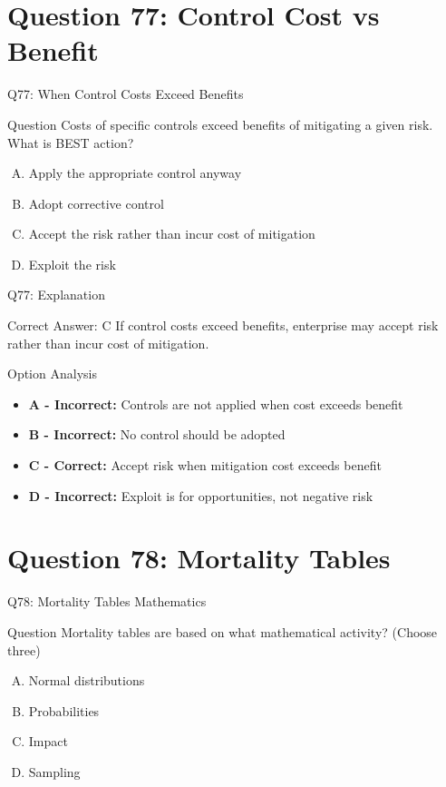 \documentclass{beamer}
\begin{document}
	
	
	
	
	
	\section{Question 77: Control Cost vs Benefit}
	
	\begin{frame}{Q77: When Control Costs Exceed Benefits}
		\begin{block}{Question}
			Costs of specific controls exceed benefits of mitigating a given risk. What is BEST action?
		\end{block}
		\begin{enumerate}[(A)]
			\item Apply the appropriate control anyway
			\item Adopt corrective control
			\item Accept the risk rather than incur cost of mitigation
			\item Exploit the risk
		\end{enumerate}
	\end{frame}
	
	\begin{frame}{Q77: Explanation}
		\begin{block}{Correct Answer: C}
			If control costs exceed benefits, enterprise may accept risk rather than incur cost of mitigation.
		\end{block}
		\begin{block}{Option Analysis}
			\begin{itemize}
				\item \textbf{A - Incorrect:} Controls are not applied when cost exceeds benefit
				\item \textbf{B - Incorrect:} No control should be adopted
				\item \textbf{C - Correct:} Accept risk when mitigation cost exceeds benefit
				\item \textbf{D - Incorrect:} Exploit is for opportunities, not negative risk
			\end{itemize}
		\end{block}
	\end{frame}
	
	\section{Question 78: Mortality Tables}
	
	\begin{frame}{Q78: Mortality Tables Mathematics}
		\begin{block}{Question}
			Mortality tables are based on what mathematical activity? (Choose three)
		\end{block}
		\begin{enumerate}[(A)]
			\item Normal distributions
			\item Probabilities
			\item Impact
			\item Sampling
		\end{enumerate}
	\end{frame}
	
\end{document}
